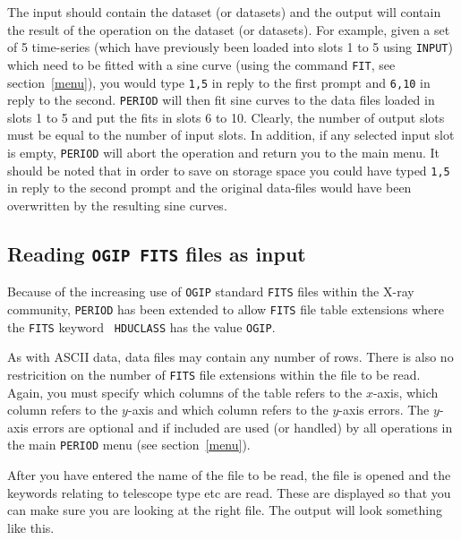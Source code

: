The input should contain the dataset (or datasets) and the output will
contain the result of the operation on the dataset (or datasets). For
example, given a set of 5 time-series (which have previously been
loaded into slots 1 to 5 using {\tt INPUT}) which need to be fitted
with a sine curve (using the command {\tt FIT}, see
section~\ref{menu}), you would type {\tt 1,5} in reply to the first
prompt and {\tt 6,10} in reply to the second. {\tt PERIOD} will then
fit sine curves to the data files loaded in slots 1 to 5 and put the
fits in slots 6 to 10. Clearly, the number of output slots must be
equal to the number of input slots. In addition, if any selected input
slot is empty, {\tt PERIOD} will abort the operation and return you to
the main menu. It should be noted that in order to save on storage
space you could have typed {\tt 1,5} in reply to the second prompt and
the original data-files would have been overwritten by the resulting
sine curves.

\subsection{Reading {\tt OGIP FITS} files as input}
\label{slots2}

Because of the increasing use of {\tt OGIP} standard {\tt FITS} files
within the X-ray community, {\tt PERIOD} has been extended to allow
{\tt FITS} file table extensions where the {\tt FITS} keyword {\tt
HDUCLASS} has the value {\tt OGIP}.

As with ASCII data, data files may contain any number of rows. There is
also no restricition on the number of {\tt FITS} file extensions within
the file to be read.  Again, you must specify which columns of
the table refers to the $x$-axis, which column refers to the $y$-axis
and which column refers to the $y$-axis errors. The $y$-axis errors are
optional and if included are used (or handled) by all operations in the
main {\tt PERIOD} menu (see section~\ref{menu}).

After you have entered the name of the file to be read, the file is
opened and the keywords relating to telescope type etc are
read. These are displayed so that you can make sure you are looking at
the right file. The output will look something like this.

